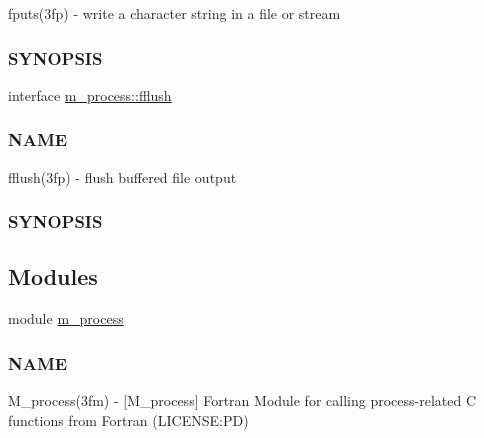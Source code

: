 \begin{DoxyCompactItemize}
\begin{DoxyCompactList}
fputs(3fp) -\/ write a character string in a file or stream \subsubsection*{S\+Y\+N\+O\+P\+S\+IS}\end{DoxyCompactList}\item 
interface \mbox{\hyperlink{interfacem__process_1_1fflush}{m\+\_\+process\+::fflush}}
\begin{DoxyCompactList}\small\item\em \subsubsection*{N\+A\+ME}

fflush(3fp) -\/ flush buffered file output \subsubsection*{S\+Y\+N\+O\+P\+S\+IS}\end{DoxyCompactList}\end{DoxyCompactItemize}
\subsection*{Modules}
\begin{DoxyCompactItemize}
\item 
module \mbox{\hyperlink{namespacem__process}{m\+\_\+process}}
\begin{DoxyCompactList}\small\item\em \subsubsection*{N\+A\+ME}

M\+\_\+process(3fm) -\/ \mbox{[}M\+\_\+process\mbox{]} Fortran Module for calling process-\/related C functions from Fortran (L\+I\+C\+E\+N\+SE\+:PD) \end{DoxyCompactList}\end{DoxyCompactItemize}
